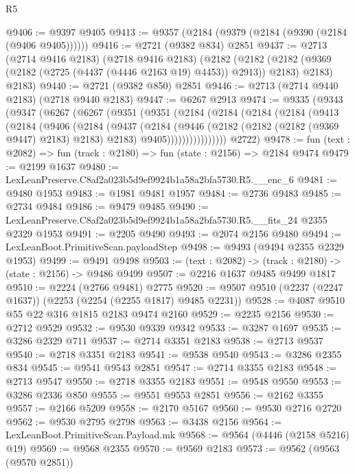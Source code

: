 \begin{lexlean}{R5}
\begin{coremodule}
@9406 := @9397 @9405
@9413 := @9357 (@2184 (@9379 (@2184 (@9390 (@2184 (@9406 @9405))))))
@9416 := @2721 (@9382 @834) @2851
@9437 := @2713
    (@2714 @9416 @2183)
    (@2718 @9416 @2183)
    (@2182
      (@2182 (@2182 (@9369 (@2182 (@2725 (@4437 (@4446 @2163 @19) @4453)) @2913)) @2183) @2183)
      @2183)
@9440 := @2721 (@9382 @850) @2851
@9446 := @2713 (@2714 @9440 @2183) (@2718 @9440 @2183)
@9447 := @6267 @2913
@9474 := @9335
    (@9343
      (@9347
        (@6267
          (@6267
            (@9351
              (@9351
                (@2184
                  (@2184
                    (@2184
                      (@2184
                        (@9413
                          (@2184
                            (@9406
                              (@2184
                                (@9437
                                  (@2184
                                    (@9446
                                      (@2182 (@2182 (@2182 (@9369 @9447) @2183) @2183) @2183)
                                      @9405))))))))))))))))
      @2722)
@9478 := fun (text : @2082) => fun (track : @2180) => fun (state : @2156) => @2184 @9474
@9479 := @2199 @1637
@9480 := LexLeanPreserve.C8af2a023b5d9ef9924b1a58a2bfa5730.R5.__enc_6
@9481 := @9480 @1953
@9483 := @1981 @9481 @1957
@9484 := @2736 @9483
@9485 := @2734 @9484
@9486 := @9479 @9485
@9490 := LexLeanPreserve.C8af2a023b5d9ef9924b1a58a2bfa5730.R5.__fits_24 @2355 @2329 @1953
@9491 := @2205 @9490
@9493 := @2074 @2156 @9480
@9494 := LexLeanBoot.PrimitiveScan.payloadStep
@9498 := @9493 (@9494 @2355 @2329 @1953)
@9499 := @9491 @9498
@9503 := (text : @2082) -> (track : @2180) -> (state : @2156) -> @9486 @9499
@9507 := @2216 @1637 @9485 @9499 @1817
@9510 := @2224 (@2766 @9481) @2775
@9520 := @9507 @9510 (@2237 (@2247 @1637)) (@2253 (@2254 (@2255 @1817) @9485 @2231))
@9528 := @4087 @9510 @55 @22 @316 @1815 @2183 @9474 @2160
@9529 := @2235 @2156
@9530 := @2712 @9529
@9532 := @9530 @9339 @9342
@9533 := @3287 @1697
@9535 := @3286 @2329 @711
@9537 := @2714 @3351 @2183
@9538 := @2713 @9537
@9540 := @2718 @3351 @2183
@9541 := @9538 @9540
@9543 := @3286 @2355 @834
@9545 := @9541 @9543 @2851
@9547 := @2714 @3355 @2183
@9548 := @2713 @9547
@9550 := @2718 @3355 @2183
@9551 := @9548 @9550
@9553 := @3286 @2336 @850
@9555 := @9551 @9553 @2851
@9556 := @2162 @3355
@9557 := @2166 @5209
@9558 := @2170 @5167
@9560 := @9530 @2716 @2720
@9562 := @9530 @2795 @2798
@9563 := @3438 @2156
@9564 := LexLeanBoot.PrimitiveScan.Payload.mk
@9568 := @9564 (@4446 (@2158 @5216) @19)
@9569 := @9568 @2355
@9570 := @9569 @2183
@9573 := @9562 (@9563 (@9570 @2851))

\end{coremodule}
\end{lexlean}
